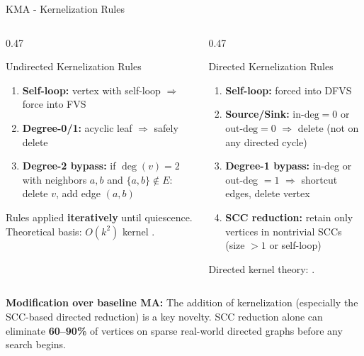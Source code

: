 \documentclass[aspectratio=169]{beamer}
\renewcommand{\footnotesize}{\tiny}
\begin{document}
\begin{frame}{KMA - Kernelization Rules}
	\begin{columns}[T]
		\begin{column}{0.47\textwidth}
			\begin{block}{Undirected Kernelization Rules}
				\begin{enumerate}\setlength\itemsep{3pt}
					\item \textbf{Self-loop:} vertex with self-loop $\Rightarrow$ force into FVS
					\item \textbf{Degree-0/1:} acyclic leaf $\Rightarrow$ safely delete
					\item \textbf{Degree-2 bypass:} if $\deg(v)=2$ with neighbors $a,b$
					      and $\{a,b\}\notin E$:
					      delete $v$, add edge $(a,b)$
				\end{enumerate}
				Rules applied \textbf{iteratively} until quiescence.\\[4pt]
				Theoretical basis: $O(k^2)$ kernel \cite{thomasse2010}.
			\end{block}
		\end{column}
		\begin{column}{0.47\textwidth}
			\begin{block}{Directed Kernelization Rules}
				\begin{enumerate}\setlength\itemsep{3pt}
					\item \textbf{Self-loop:} forced into DFVS
					\item \textbf{Source/Sink:} $\text{in-deg}=0$ or $\text{out-deg}=0$
					      $\Rightarrow$ delete (not on any directed cycle)
					\item \textbf{Degree-1 bypass:} in-deg or out-deg $=1$
					      $\Rightarrow$ shortcut edges, delete vertex
					\item \textbf{SCC reduction:} retain only vertices in
					      nontrivial SCCs (size $>1$ or self-loop)
				\end{enumerate}
				Directed kernel theory: \cite{chen2008dfvs}.
			\end{block}
		\end{column}
	\end{columns}
	\vspace{4pt}
	\begin{tcolorbox}[greenbox,fontupper=\footnotesize]
		\textbf{Modification over baseline MA:} The addition of kernelization
		(especially the SCC-based directed reduction) is a key novelty.
		SCC reduction alone can eliminate \textbf{60--90\%} of vertices
		on sparse real-world directed graphs before any search begins.
	\end{tcolorbox}
\end{frame}
\end{document}
